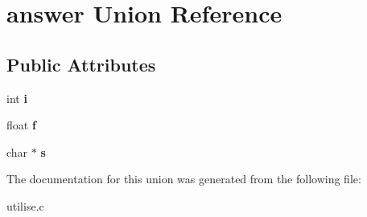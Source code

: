 \hypertarget{unionanswer}{}\section{answer Union Reference}
\label{unionanswer}
\subsection*{Public Attributes}
\begin{DoxyCompactItemize}
\item 
int {\bfseries i}\hypertarget{unionanswer_ab9581dbea3c0dbaf8a719b5b84323a34}{}\label{unionanswer_ab9581dbea3c0dbaf8a719b5b84323a34}

\item 
float {\bfseries f}\hypertarget{unionanswer_aa8b5513fa98d8e91d3799947ded1bf21}{}\label{unionanswer_aa8b5513fa98d8e91d3799947ded1bf21}

\item 
char $\ast$ {\bfseries s}\hypertarget{unionanswer_aabec9430aa5dd05dc5ca50a48cfebb56}{}\label{unionanswer_aabec9430aa5dd05dc5ca50a48cfebb56}

\end{DoxyCompactItemize}


The documentation for this union was generated from the following file\+:\begin{DoxyCompactItemize}
\item 
utilise.\+c\end{DoxyCompactItemize}
